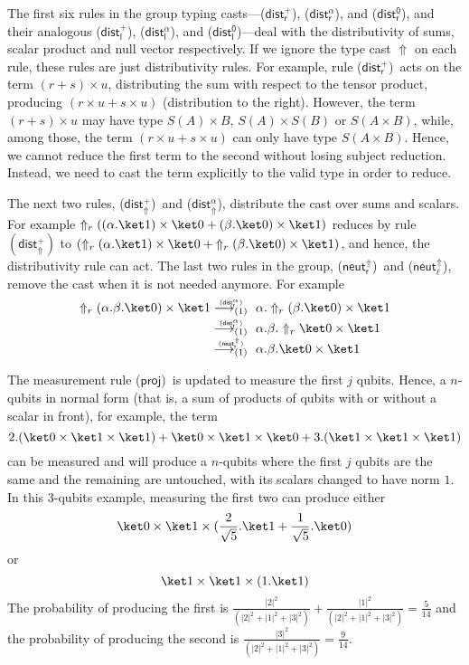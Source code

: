 \documentclass[preprint]{elsarticle}
\newcommand\lra[1][1]{\longrightarrow_{\left(#1\right)}}
\newcommand\pair[2]{({#1}+{#2})}
\newcommand\s[1]{\ensuremath{\mathsf{#1}}}
\newcommand\red[2][1]{\overset{\scriptscriptstyle\smash{#2}\vphantom{x}}{\lra[#1]}\ }
\newcommand\rdistcasum{(\s{dist^+_\Uparrow})}
\newcommand\rdistcascal{(\s{dist^\alpha_\Uparrow})}
\newcommand\rcaneutl{(\s{neut^\Uparrow_\ell})}
\newcommand\rcaneutr{(\s{neut^\Uparrow_r})}
\newcommand\rproj{(\s{proj})}
\newcommand\rdistzr{(\s{dist^0_r})}
\newcommand\rdistzl{(\s{dist^0_l})}
\newcommand\rdistscalr{(\s{dist^\alpha_r})}
\newcommand\rdistscall{(\s{dist^\alpha_l})}
\newcommand\rdistsumr{(\s{dist^+_r})}
\newcommand\rdistsuml{(\s{dist^+_l})}
\begin{document}
The first six rules in the group typing casts---\rdistsumr, \rdistscalr, and
\rdistzr, and their analogous \rdistsuml, \rdistscall, and \rdistzl---deal with
the distributivity of sums, scalar product and null vector respectively. If we
ignore the type cast $\Uparrow$ on each rule, these rules are just
distributivity rules. For example, rule \rdistsumr\ acts on the term $\pair
rs\times u$, distributing the sum with respect to the tensor product, producing
$\pair{r\times u}{s\times u}$ (distribution to the right). However, the term
$\pair rs\times u$ may have type $S(A)\times B$, $S(A)\times S(B)$ or
$S(A\times B)$, while, among those, the term $\pair{r\times u}{s\times u}$
can only have type $S(A\times B)$. Hence, we cannot reduce the first term to
the second without losing subject reduction. Instead, we need to cast the term
explicitly to the valid type in order to reduce.

The next two rules, \rdistcasum\ and \rdistcascal, distribute the cast over sums
and scalars. For example $\Uparrow_r \pair{(\alpha.\ket 1)\times\ket 0} {(\beta.\ket 0)\times\ket 1}$ reduces by rule $\rdistcasum$
to $\pair { \Uparrow_r (\alpha.\ket 1)\times\ket 0 }{\Uparrow_r (\beta.\ket 0)\times\ket 1 }$, and hence,
the distributivity rule can act.
The last two rules in the group, \rcaneutr\ and \rcaneutl, remove the cast when
it is not needed anymore. For example
\begin{align*}
  \Uparrow_r (\alpha.\beta.\ket 0)\times\ket 1 & \red{\rdistscalr} \alpha.\Uparrow_r (\beta. \ket 0)\times\ket 1\\
                                               &\red{\rdistscalr} \alpha. \beta. \Uparrow_r \ket 0\times\ket 1\\
                                               &\red{\rcaneutr} \alpha.\beta.\ket 0\times\ket 1
\end{align*}


The measurement rule \rproj\ is updated to measure the first $j$ qubits. Hence,
a $n$-qubits in normal form (that is, a sum of products of qubits with or without
a scalar in front), for example, the term
\[
  2.(\ket 0\times\ket 1\times\ket 1)+ \ket 0\times\ket 1\times\ket 0 + 3.(\ket 1\times\ket 1\times\ket 1)
\]
can be measured and will produce a $n$-qubits where the
first $j$ qubits are the same and the remaining are untouched, with its scalars
changed to have norm $1$. In this 3-qubits example, measuring the first two can
produce either
\[\ket 0\times\ket 1\times\pair{\frac 2{\sqrt{5}}.\ket 1}{\frac 1{\sqrt{5}}.\ket
    0}\]
or
\[\ket 1\times\ket 1\times(1.\ket 1)\]
The
probability of producing the first is
$\tfrac{|2|^2}{(|2|^2+|1|^2+|3|^2)}+\tfrac{|1|^2}{(|2|^2+|1|^2+|3|^2)} =
\tfrac{5}{14}$ and the probability of producing the second is
$\tfrac{|3|^2}{(|2|^2+|1|^2+|3|^2)}=\tfrac{9}{14}$.
\end{document}
